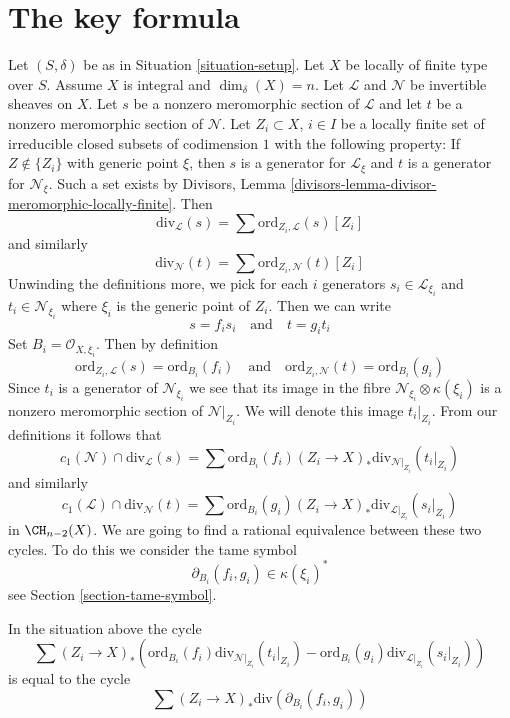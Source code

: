 \section{The key formula}
\label{section-key}

\noindent
Let $(S, \delta)$ be as in Situation \ref{situation-setup}.
Let $X$ be locally of finite type over $S$. Assume
$X$ is integral and $\dim_\delta(X) = n$.
Let $\mathcal{L}$ and $\mathcal{N}$ be invertible sheaves on $X$.
Let $s$ be a nonzero meromorphic section of $\mathcal{L}$ and
let $t$ be a nonzero meromorphic section of $\mathcal{N}$.
Let $Z_i \subset X$, $i \in I$ be a locally finite set of irreducible
closed subsets of codimension $1$ with the following property:
If $Z \not \in \{Z_i\}$ with generic point $\xi$, then $s$ is a generator
for $\mathcal{L}_\xi$ and $t$ is a generator for $\mathcal{N}_\xi$.
Such a set exists by
Divisors, Lemma \ref{divisors-lemma-divisor-meromorphic-locally-finite}.
Then
$$
\text{div}_\mathcal{L}(s) = \sum \text{ord}_{Z_i, \mathcal{L}}(s) [Z_i]
$$
and similarly
$$
\text{div}_\mathcal{N}(t) = \sum \text{ord}_{Z_i, \mathcal{N}}(t) [Z_i]
$$
Unwinding the definitions more, we pick for each $i$ generators
$s_i \in \mathcal{L}_{\xi_i}$ and $t_i \in \mathcal{N}_{\xi_i}$
where $\xi_i$ is the generic point of $Z_i$. Then we can write
$$
s = f_i s_i
\quad\text{and}\quad
t = g_i t_i
$$
Set $B_i = \mathcal{O}_{X, \xi_i}$. Then by definition
$$
\text{ord}_{Z_i, \mathcal{L}}(s) = \text{ord}_{B_i}(f_i)
\quad\text{and}\quad
\text{ord}_{Z_i, \mathcal{N}}(t) = \text{ord}_{B_i}(g_i)
$$
Since $t_i$ is a generator of $\mathcal{N}_{\xi_i}$ we see that
its image in the fibre $\mathcal{N}_{\xi_i} \otimes \kappa(\xi_i)$
is a nonzero meromorphic section of $\mathcal{N}|_{Z_i}$. We will denote
this image $t_i|_{Z_i}$. From our definitions it follows that
$$
c_1(\mathcal{N}) \cap \text{div}_\mathcal{L}(s) =
\sum \text{ord}_{B_i}(f_i)
(Z_i \to X)_*\text{div}_{\mathcal{N}|_{Z_i}}(t_i|_{Z_i})
$$
and similarly
$$
c_1(\mathcal{L}) \cap \text{div}_\mathcal{N}(t) =
\sum \text{ord}_{B_i}(g_i)
(Z_i \to X)_*\text{div}_{\mathcal{L}|_{Z_i}}(s_i|_{Z_i})
$$
in $\CH_{n - 2}(X)$. We are going to find a rational equivalence between
these two cycles. To do this we consider the tame symbol
$$
\partial_{B_i}(f_i, g_i) \in \kappa(\xi_i)^*
$$
see Section \ref{section-tame-symbol}.

\begin{lemma}
\label{lemma-key-formula}
In the situation above the cycle
$$
\sum
(Z_i \to X)_*\left(
\text{ord}_{B_i}(f_i) \text{div}_{\mathcal{N}|_{Z_i}}(t_i|_{Z_i}) -
\text{ord}_{B_i}(g_i) \text{div}_{\mathcal{L}|_{Z_i}}(s_i|_{Z_i}) \right)
$$
is equal to the cycle
$$
\sum (Z_i \to X)_*\text{div}(\partial_{B_i}(f_i, g_i))
$$
\end{lemma}

